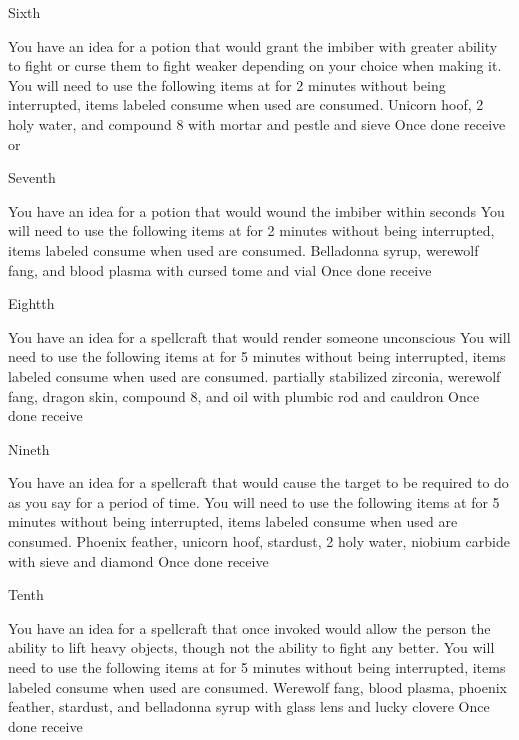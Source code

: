 \documentclass[greennotebook]{guildcamp3} %
\begin{document}
\begin{page}{Sixth}
	
	You have an idea for a potion that would grant the imbiber with greater ability to fight or curse them to fight weaker depending on your choice when making it.
	You will need to use the following items at \sMageWorkbench{} for 2 minutes without being interrupted, items labeled consume when used are consumed.
	Unicorn hoof, 2 holy water, and compound 8 with mortar and pestle and sieve
	Once done receive \iCRUpPotion{} or \iCRDownPotion{}
	
\end{page}

\begin{page}{Seventh}
	
	You have an idea for a potion that would wound the imbiber within seconds
	You will need to use the following items at \sMageWorkbench{} for 2 minutes without being interrupted, items labeled consume when used are consumed.
	Belladonna syrup, werewolf fang, and blood plasma with cursed tome and vial
	Once done receive \iMagicPoison{}
	
\end{page}

\begin{page}{Eightth}
	
	You have an idea for a spellcraft that would render someone unconscious
	You will need to use the following items at \sMageWorkbench{} for 5 minutes without being interrupted, items labeled consume when used are consumed.
	partially stabilized zirconia, werewolf fang, dragon skin, compound 8, and oil with plumbic rod and cauldron
	Once done receive \iKOSpell{}
	
\end{page}

\begin{page}{Nineth}
	
	You have an idea for a spellcraft that would cause the target to be required to do as you say for a period of time.
	You will need to use the following items at \sMageWorkbench{} for 5 minutes without being interrupted, items labeled consume when used are consumed.
	Phoenix feather, unicorn hoof, stardust, 2 holy water, niobium carbide with sieve and diamond
	Once done receive \iMCSpell{}
	
\end{page}

\begin{page}{Tenth}
	
	You have an idea for a spellcraft that once invoked would allow the person the ability to lift heavy objects, though not the ability to fight any better.
	You will need to use the following items at \sMageWorkbench{} for 5 minutes without being interrupted, items labeled consume when used are consumed.
	Werewolf fang, blood plasma, phoenix feather, stardust, and belladonna syrup with glass lens and lucky clovere
	Once done receive \iStrengthSpell{}
	
\end{page}
\end{document}

